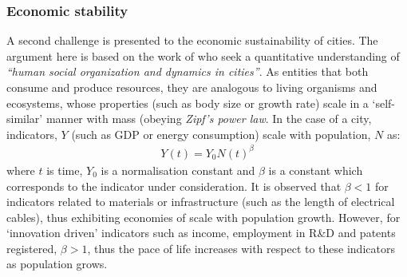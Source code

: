 \subsubsection*{Economic stability}
A second challenge is presented to the economic sustainability of cities. The argument here is based on the work of \citet{Bettencourt2007} who seek a quantitative understanding of \emph{``human social organization and dynamics in cities''}. As entities that both consume and produce resources, they are analogous to living organisms and ecosystems, whose properties (such as body size or growth rate) scale in a `self-similar' manner with mass (obeying \emph{Zipf's power law}. In the case of a city, indicators, $Y$ (such as GDP or energy consumption) scale with population, $N$ as:
\begin{align} \label{eq:urban_scale}
	Y(t)=Y_0N(t)^{\beta}
\end{align}
where $t$ is time, $Y_0$ is a normalisation constant and $\beta$ is a constant which corresponds to the indicator under consideration. It is observed that $\beta<1$ for indicators related to materials or infrastructure (such as the length of electrical cables), thus exhibiting economies of scale with population growth. However, for `innovation driven' indicators such as income, employment in R\&D and patents registered, $\beta>1$, thus the pace of life increases with respect to these indicators as population grows. %

